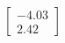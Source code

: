 \documentclass[preview]{standalone}
\begin{document}
\begin{align*}
\begin{bmatrix} -4.03 \\ 2.42 \end{bmatrix}
\end{align*}
\end{document}
